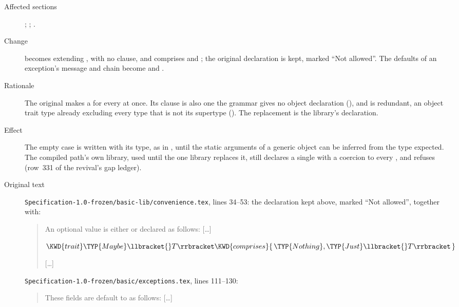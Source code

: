 \begin{description}
\item[Affected sections] ;
; .
\item[Change]  becomes
extending , with no
 clause, and  comprises
 and
; the original declaration is kept,
marked ``Not allowed''. The defaults of an exception's message and chain
become  and
.
\item[Rationale] The original makes  a
 for every  at once. Its
 clause is also one the grammar gives no object declaration
(), and is redundant, an object trait type already
excluding every type that is not its supertype ().
The replacement is the library's declaration.
\item[Effect] The empty case is written with its type, as in
, until the static
arguments of a generic object can be inferred from the type expected.
The compiled path's own library, used until the one library replaces it,
still declares a single  with a coercion to every
, and refuses
(row~331 of the revival's gap ledger).
\item[Original text] \nolinkurl{Specification-1.0-frozen/basic-lib/convenience.tex},
lines 34--53: the declaration kept above, marked ``Not allowed'', together
with:
\begin{quote}
An optional value  is either  or
 declared as follows:
[\ldots]
\begin{Fortress}
\(\KWD{trait} \TYP{Maybe}\llbracket{}T\rrbracket \KWD{comprises} \{\,\TYP{Nothing}, \TYP{Just}\llbracket{}T\rrbracket\,\}\)
\end{Fortress}
[\ldots]
\end{quote}
\nolinkurl{Specification-1.0-frozen/basic/exceptions.tex}, lines 111--130:
\begin{quote}
These fields are default to  as follows: [\ldots]
\begin{Fortress}

\end{Fortress}
\end{quote}
\end{description}
